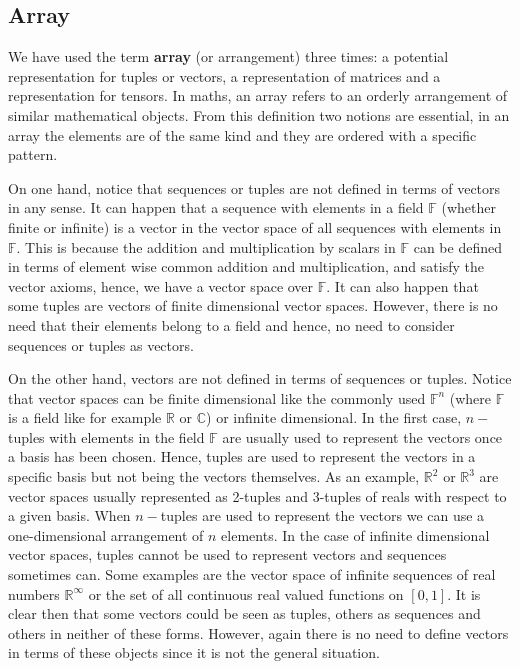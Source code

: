         \subsection*{Array}
We have used the term \textbf{array} (or arrangement) three times: 
a potential representation for tuples or vectors, 
a representation of matrices and a representation for tensors. 
In maths, an array refers to an orderly arrangement of similar 
mathematical objects. From this definition two notions are essential, 
in an array the elements are of the same kind and they are ordered with a specific pattern.

On one hand, notice that sequences or tuples are not defined in terms of vectors in any sense. 
It can happen that a sequence with elements in a field $\mathbb{F}$ 
(whether finite or infinite)
is a vector in the vector space of all sequences with elements in $\mathbb{F}$.
This is because the addition and multiplication by scalars in $\mathbb{F}$ 
can be defined in terms of element wise common addition and multiplication, 
and satisfy the vector axioms, hence, we have a vector space over $\mathbb{F}$. 
It can also happen that some tuples are vectors of finite dimensional vector spaces. 
However, there is no need that their elements belong to a field and hence, no need 
to consider sequences or tuples  as vectors. 

\newpage
On the other hand, vectors are not defined in terms of sequences or tuples.
Notice that vector spaces can be finite dimensional like the commonly used $\mathbb{F}^{n}$ 
(where $\mathbb{F}$ is a field like for example $\mathbb{R}$ or $\mathbb{C}$) or infinite dimensional.
In the first case, $n-$tuples with elements in the field $\mathbb{F}$ are usually used to represent the vectors once a basis has been chosen. 
Hence, tuples are used to represent the vectors in a specific basis but not being the vectors themselves.
As an example, $\mathbb{R}^{2}$ or $\mathbb{R}^{3}$ are vector spaces 
usually represented as 2-tuples and 3-tuples of reals with respect to a given basis.
When $n-$tuples are used to represent the vectors we can use a one-dimensional arrangement of $n$ elements.
In the case of infinite dimensional vector spaces, tuples cannot be used to represent vectors and sequences sometimes can. 
Some examples are the vector space of infinite sequences of real numbers $\mathbb{R}^\infty$ or 
the set of all continuous real valued functions on $[0,1]$.
It is clear then that some vectors could be seen as tuples, others as sequences and others in neither of these forms. 
However, again there is no need to define 
vectors in terms of these objects since it is not the general situation. 

